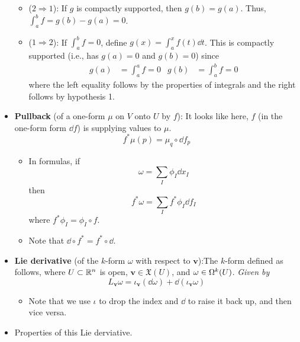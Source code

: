 \documentclass[../notes.tex]{subfiles}
\begin{document}
\begin{itemize}
\begin{itemize}
        \item ($2\Rightarrow 1$): If $g$ is compactly supported, then $g(b)=g(a)$. Thus, $\int_a^bf=g(b)-g(a)=0$.
        \item ($1\Rightarrow 2$): If $\int_a^bf=0$, define $g(x)=\int_a^xf(t)\dd{t}$. This is compactly supported (i.e., has $g(a)=0$ and $g(b)=0$) since
        \begin{align*}
            g(a) &= \int_a^af = 0&
            g(b) &= \int_a^bf = 0
        \end{align*}
        where the left equality follows by the properties of integrals and the right follows by hypothesis 1.
    \end{itemize}
    \item \textbf{Pullback} (of a one-form $\mu$ on $V$ onto $U$ by $f$): It looks like here, $f$ (in the one-form form $\dd f$) is supplying values to $\mu$.
    \begin{equation*}
        f^*\mu(p) = \mu_q\circ\dd f_p
    \end{equation*}
    \begin{itemize}
        \item In formulas, if
        \begin{equation*}
            \omega = \sum_I\phi_I\dd{x_I}
        \end{equation*}
        then
        \begin{equation*}
            f^*\omega = \sum_If^*\phi_I\dd{f_I}
        \end{equation*}
        where $f^*\phi_I=\phi_I\circ f$.
        \item Note that $\dd\circ f^*=f^*\circ\dd$.
    \end{itemize}
    \item \textbf{Lie derivative} (of the $k$-form $\omega$ with respect to $\bm{v}$):The $k$-form defined as follows, where $U\subset\R^n$ is open, $\bm{v}\in\mathfrak{X}(U)$, and $\omega\in\ome[k]{U}$. \emph{Given by}
    \begin{equation*}
        L_{\bm{v}}\omega = \iota_{\bm{v}}(\dd\omega)+\dd(\iota_{\bm{v}}\omega)
    \end{equation*}
    \begin{itemize}
        \item Note that we use $\iota$ to drop the index and $\dd$ to raise it back up, and then vice versa.
    \end{itemize}
    \item Properties of this Lie derviative.
    \begin{enumerate}

\end{enumerate}
\end{itemize}
\end{document}
